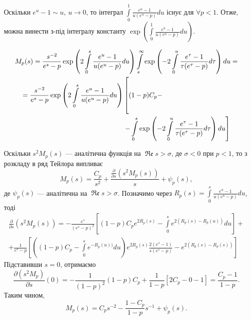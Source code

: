 Оскільки $e^u - 1 \sim u,~u \rightarrow 0$, то інтеграл $\int\limits_{0}^{1} \frac{e^u -1}{u(e^u - p)} du$ існує для $\forall p < 1$. Отже, можна винести з-під інтегралу константу $\exp\left(\int\limits_{0}^{1} \frac{e^u -1}{u(e^u - p)} du\right)$.

\begin{gather*}
M_{p}(s) = \frac{s^{-2}}{e^s-p} \exp \left(2 \int\limits_{0}^{s} \frac{e^u -1}{u(e^u - p)} du\right) \int\limits_s^\infty \exp\left(-2 \int\limits_{0}^{u} \frac{e^\tau -1}{\tau(e^\tau - p)} d\tau\right) du = \\
\begin{align*}
=\frac{s^{-2}}{e^s-p} \exp \left(2 \int\limits_{0}^{s} \frac{e^u -1}{u(e^u - p)} du\right) & \left[\rule{0cm}{1.05cm} (1-p) C_{p} - \right. \\
& \left.- \int\limits_0^s \exp\left(-2 \int\limits_{0}^{u} \frac{e^\tau -1}{\tau(e^\tau - p)} d\tau\right) du \right]
\end{align*}
\end{gather*}

Оскільки $s^2 M_{p}(s)$ --- аналітична функція на $\operatorname{\mathfrak{Re}} s > \sigma$, де $\sigma < 0$ при $p < 1$, то з розкладу в ряд Тейлора випливає
\begin{equation}
M_{p}(s) = \frac{C_{p}}{s^2} + \frac{\frac{\partial}{\partial s}(s^2 M_{p}(s))}{s} + \psi_{p}(s),
\end{equation}
де $\psi_{p}(s)$ --- аналітична на $\operatorname{\mathfrak{Re}} s > \sigma$. Позначимо через $R_{p}(s)=\int\limits_{0}^{s} \frac{e^u -1}{u(e^u - p)} du$, тоді
\begin{gather*}
\frac{\partial}{\partial s}(s^2 M_{p}(s)) = -\frac{e^s}{(e^s - p)^2} \left[(1-p) C_{p} e^{2 R_{p}(s)} - \int\limits_{0}^{s} e^{2(R_{p}(s) - R_{p}(u))} du\right] + \\
+ \frac{1}{e^s - p} \left[ \left((1 - p) C_{p} - \int\limits_{0}^{s} e^{- R_{p}(u))} du\right) e^{2R_{p}(s)} \frac{2(e^s - 1)}{s(e^s - p)} - e^{2(R_{p}(s) - R_{p}(s))} \right] 
\end{gather*}
Підставивши $s = 0$, отримаємо
\begin{equation*}
\frac{\partial (s^2 M_{p})}{\partial s}(0) = -\frac{1}{(1-p)^2} (1-p) C_{p} + \frac{1}{1-p} \left[ 2 C_{p} - 0 - 1 \right] = \frac{C_{p} - 1}{1 - p}.
\end{equation*}
Таким чином,
\begin{equation}
\label{eq:model_laplace_taylor}
M_{p}(s) = C_{p} s^{-2} - \frac{1 - C_{p}}{1 - p} s^{-1} + \psi_{p}(s).
\end{equation}

